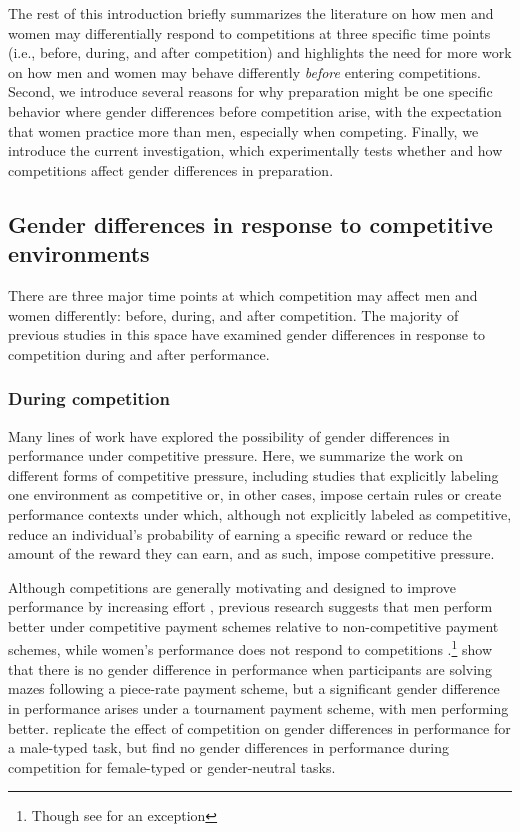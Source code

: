 \documentclass[a4paper, nobind]{templates/ociamthesis}
\begin{document}
The rest of this introduction briefly summarizes the literature on how men and women may differentially respond to competitions at three specific time points (i.e., before, during, and after competition) and highlights the need for more work on how men and women may behave differently \emph{before} entering competitions. Second, we introduce several reasons for why preparation might be one specific behavior where gender differences before competition arise, with the expectation that women practice more than men, especially when competing. Finally, we introduce the current investigation, which experimentally tests whether and how competitions affect gender differences in preparation.

\hypertarget{gender-differences-in-response-to-competitive-environments}{%
\subsection{Gender differences in response to competitive environments}\label{gender-differences-in-response-to-competitive-environments}}

There are three major time points at which competition may affect men and women differently: before, during, and after competition. The majority of previous studies in this space have examined gender differences in response to competition during and after performance.

\hypertarget{during-competition}{%
\subsubsection{During competition}\label{during-competition}}

Many lines of work have explored the possibility of gender differences in performance under competitive pressure. Here, we summarize the work on different forms of competitive pressure, including studies that explicitly labeling one environment as competitive or, in other cases, impose certain rules or create performance contexts under which, although not explicitly labeled as competitive, reduce an individual's probability of earning a specific reward or reduce the amount of the reward they can earn, and as such, impose competitive pressure.

Although competitions are generally motivating and designed to improve performance by increasing effort \autocite{Connelly2014a,Murayama2012,Miller2019a}, previous research suggests that men perform better under competitive payment schemes relative to non-competitive payment schemes, while women's performance does not respond to competitions \autocite{Gneezy2003,Gneezy2004,Gunther2010,Samak2013,Booth2022,Gneezy2004,Niederle2011,Cotton2013}.\footnote{Though see \textcite{Dreber2011} for an exception} \textcite{Gneezy2003} show that there is no gender difference in performance when participants are solving mazes following a piece-rate payment scheme, but a significant gender difference in performance arises under a tournament payment scheme, with men performing better. \textcite{Gunther2010} replicate the effect of competition on gender differences in performance for a male-typed task, but find no gender differences in performance during competition for female-typed or gender-neutral tasks.
\end{document}
